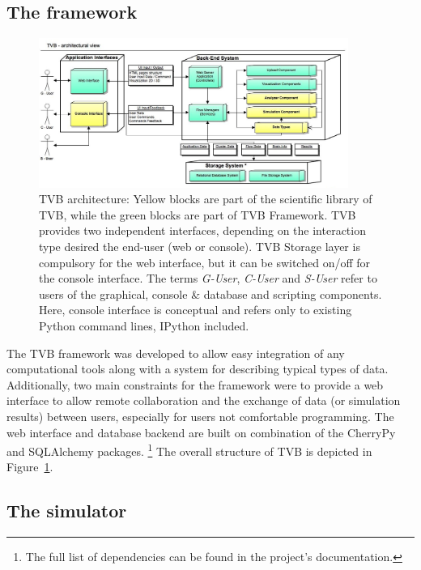\documentclass{bioinfo}
\begin{document}
\subsection{The framework}

 \begin{figure}
        \centering
        \includegraphics[width=0.90\textwidth]{images/architecture.jpg}
        \caption{TVB architecture: Yellow blocks are part of the scientific
            library of TVB, while the green blocks are part of TVB Framework.
            TVB provides two independent interfaces, depending on the
            interaction type desired the end-user (web or console).  TVB
            Storage layer is compulsory for the web interface, but it can be
	    switched on/off for the console interface.  The terms \textit{G-User},
	    \textit{C-User} and \textit{S-User} refer to users of the graphical,
	    console \& database and scripting components. Here, console interface
	    is conceptual and refers only to existing Python command lines, IPython
	    included. 
         }
        \label{fig:architecture}
 \end{figure}

The TVB framework was developed to allow easy integration of any
computational tools along with a system for describing typical types of data.
Additionally, 
two main constraints for the framework were to provide a web
interface to allow remote collaboration and the
exchange of data (or simulation results) between users, especially for
users not comfortable programming. The web interface
and database backend are built on combination of 
the \textsf{CherryPy} and \textsf{SQLAlchemy} packages.
\footnote{The full list of dependencies can be found in the
project's documentation.}
The overall structure of TVB is depicted in Figure~\ref{fig:architecture}.

\subsection{The simulator}
\end{document}
